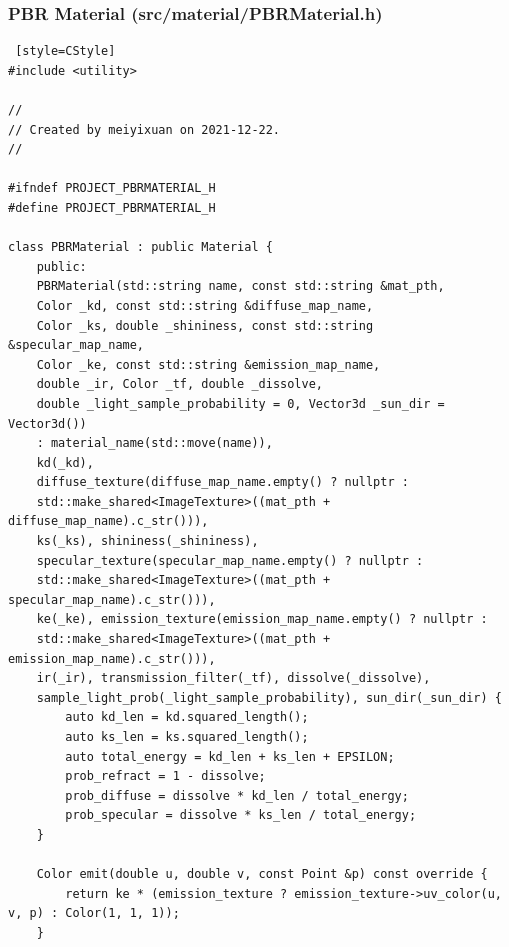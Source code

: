 \documentclass[utf8]{article}
\begin{document}
\subsubsection{PBR Material (src/material/PBRMaterial.h)}
\begin{lstlisting} [style=CStyle]
#include <utility>

//
// Created by meiyixuan on 2021-12-22.
//

#ifndef PROJECT_PBRMATERIAL_H
#define PROJECT_PBRMATERIAL_H

class PBRMaterial : public Material {
	public:
	PBRMaterial(std::string name, const std::string &mat_pth,
	Color _kd, const std::string &diffuse_map_name,
	Color _ks, double _shininess, const std::string &specular_map_name,
	Color _ke, const std::string &emission_map_name,
	double _ir, Color _tf, double _dissolve,
	double _light_sample_probability = 0, Vector3d _sun_dir = Vector3d())
	: material_name(std::move(name)),
	kd(_kd),
	diffuse_texture(diffuse_map_name.empty() ? nullptr :
	std::make_shared<ImageTexture>((mat_pth + diffuse_map_name).c_str())),
	ks(_ks), shininess(_shininess),
	specular_texture(specular_map_name.empty() ? nullptr :
	std::make_shared<ImageTexture>((mat_pth + specular_map_name).c_str())),
	ke(_ke), emission_texture(emission_map_name.empty() ? nullptr :
	std::make_shared<ImageTexture>((mat_pth + emission_map_name).c_str())),
	ir(_ir), transmission_filter(_tf), dissolve(_dissolve),
	sample_light_prob(_light_sample_probability), sun_dir(_sun_dir) {
		auto kd_len = kd.squared_length();
		auto ks_len = ks.squared_length();
		auto total_energy = kd_len + ks_len + EPSILON;
		prob_refract = 1 - dissolve;
		prob_diffuse = dissolve * kd_len / total_energy;
		prob_specular = dissolve * ks_len / total_energy;
	}
	
	Color emit(double u, double v, const Point &p) const override {
		return ke * (emission_texture ? emission_texture->uv_color(u, v, p) : Color(1, 1, 1));
	}
	

\end{lstlisting}
\end{document}

